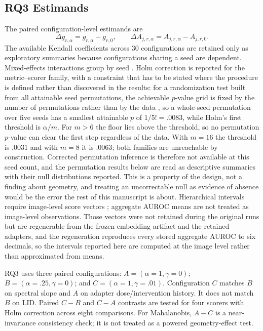 \documentclass[11pt,a4paper]{article}
\begin{document}
\subsection{RQ3 Estimands}
The paired configuration-level estimands are
\begin{equation}
\Delta g_{r,\alpha}=g_{r,\alpha}-g_{r,0},\qquad
\Delta A_{j,r,\alpha}=A_{j,r,\alpha}-A_{j,r,0}.
\end{equation}
The available Kendall coefficients across 30 configurations are retained only as exploratory summaries because configurations sharing a seed are dependent. Mixed-effects interactions group by seed \cite{b18}. Holm correction \cite{b19} is reported for the metric--scorer family, with a constraint that has to be stated where the procedure is defined rather than discovered in the results: for a randomization test built from all attainable seed permutations, the achievable $p$-value grid is fixed by the number of permutations rather than by the data \cite{b23}, so a whole-seed permutation over five seeds has a smallest attainable $p$ of $1/5!=.0083$, while Holm's first threshold is $\alpha/m$. For $m>6$ the floor lies above the threshold, so no permutation $p$-value can clear the first step regardless of the data. With $m=16$ the threshold is $.0031$ and with $m=8$ it is $.0063$; both families are unreachable by construction. Corrected permutation inference is therefore not available at this seed count, and the permutation results below are read as descriptive summaries with their null distributions reported. This is a property of the design, not a finding about geometry, and treating an uncorrectable null as evidence of absence would be the error the rest of this manuscript is about. Hierarchical intervals require image-level score vectors \cite{b20}; aggregate AUROC means are not treated as image-level observations. Those vectors were not retained during the original runs but are regenerable from the frozen embedding artifact and the retained adapters, and the regeneration reproduces every stored aggregate AUROC to six decimals, so the intervals reported here are computed at the image level rather than approximated from means.

RQ3 uses three paired configurations: $A=(\alpha=1,\gamma=0)$; $B=(\alpha=.25,\gamma=0)$; and $C=(\alpha=1,\gamma=.01)$. Configuration $C$ matches $B$ on spectral slope and $A$ on adapter dose/intervention history. It does not match $B$ on LID. Paired $C-B$ and $C-A$ contrasts are tested for four scorers with Holm correction across eight comparisons. For Mahalanobis, $A-C$ is a near-invariance consistency check; it is not treated as a powered geometry-effect test.
\end{document}
